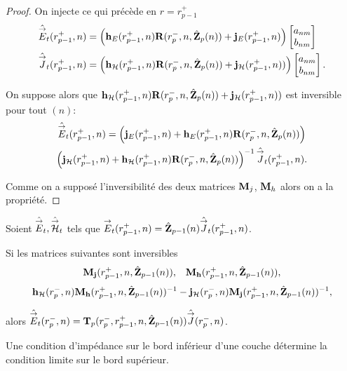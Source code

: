 \begin{proof}
      On injecte ce qui précède en \(r = r_{p-1}^+\)
      \begin{align*}
        \hat{{\overset{\rightarrow}{E}}}_t(r_{p-1}^+,n) &= 
        \left(\mathbf{h}_{E}(r_{p-1}^+,n)\mathbf{R}(r_{p}^-,n,\hat{\mathbf{Z}}_p(n)) + \mathbf{j}_{E}(r_{p-1}^+,n)\right)
        \begin{bmatrix}
          a_{nm} \\
          b_{nm}
        \end{bmatrix}
        \\
        \hat{{\overset{\rightarrow}{J}}}_t(r_{p-1}^+,n) &=
        \left(\mathbf{h}_{\mathcal{H}}(r_{p-1}^+,n)\mathbf{R}(r_{p}^-,n,\hat{\mathbf{Z}}_p(n)) + \mathbf{j}_{\mathcal{H}}(r_{p-1}^+,n))\right)
        \begin{bmatrix}
          a_{nm} \\
          b_{nm}
        \end{bmatrix}.
      \end{align*}

      On suppose alors que \(\mathbf{h}_{\mathcal{H}}(r_{p-1}^+,n)\mathbf{R}(r_{p}^-,n,\hat{\mathbf{Z}}_p(n)) + \mathbf{j}_{\mathcal{H}}(r_{p-1}^+,n))\) est inversible pour tout \((n)\):
      \begin{multline*}
        \hat{{\overset{\rightarrow}{E}}}_t(r_{p-1}^+,n) =
        \left(\mathbf{j}_{E}(r_{p-1}^+,n) + \mathbf{h}_{E}(r_{p-1}^+,n)\mathbf{R}(r_{p}^-,n,\hat{\mathbf{Z}}_p(n))\right) \\
        \left(\mathbf{j}_{\mathcal{H}}(r_{p-1}^+,n) + \mathbf{h}_{\mathcal{H}}(r_{p-1}^+,n)\mathbf{R}(r_{p}^-,n,\hat{\mathbf{Z}}_p(n))\right)^{-1}
        \hat{{\overset{\rightarrow}{J}}}_t(r_{p-1}^+,n).
      \end{multline*}

      Comme on a supposé l'inversibilité des deux matrices \(\mathbf{M}_j\), \(\mathbf{M}_h\) alors on a la propriété.
    \end{proof}

    \begin{prop}%
      \label{prop:sphere:relevement:impedance}

      Soient \(\hat{{\overset{\rightarrow}{E}}}_t,\hat{{\overset{\rightarrow}{\mathcal{H}}}}_t\) tels que \({\overset{\rightarrow}{E}}_t(r_{p-1}^+,n) = \hat{\mathbf{Z}}_{p-1}(n)\hat{{\overset{\rightarrow}{J}}}_t(r_{p-1}^+,n)\).

      Si les matrices suivantes sont inversibles
      \begin{align*}
        \mathbf{M}_{\mathbf{j}}(r_{p-1}^+,n,\hat{\mathbf{Z}}_{p-1}(n)), && \mathbf{M}_{\mathbf{h}}(r_{p-1}^+,n,\hat{\mathbf{Z}}_{p-1}(n)),
      \end{align*}
      \begin{align*}
        \mathbf{h}_{\mathcal{H}}(r_{p}^-,n)\mathbf{M}_{\mathbf{h}}(r_{p-1}^+,n,\hat{\mathbf{Z}}_{p-1}(n))^{-1} - \mathbf{j}_{\mathcal{H}}(r_{p}^-,n)\mathbf{M}_{\mathbf{j}}(r_{p-1}^+,n,\hat{\mathbf{Z}}_{p-1}(n))^{-1},
      \end{align*}

      alors \(\hat{{\overset{\rightarrow}{E}}}_t(r_{p}^-,n) = \mathbf{T}_p(r_p^-,r_{p-1}^+,n,\hat{\mathbf{Z}}_{p-1}(n))\hat{{\overset{\rightarrow}{J}}}(r_{p}^-,n)\).

      Une condition d'impédance sur le bord inférieur d'une couche détermine la condition limite sur le bord supérieur.
    \end{prop}

